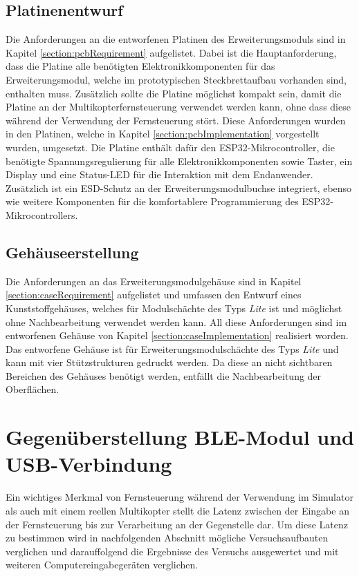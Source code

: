 \subsection{Platinenentwurf}
Die Anforderungen an die entworfenen Platinen des Erweiterungsmoduls sind in Kapitel \ref{section:pcbRequirement} aufgelistet. Dabei ist die Hauptanforderung, dass die Platine alle benötigten Elektronikkomponenten für das Erweiterungsmodul, welche im prototypischen Steckbrettaufbau vorhanden sind, enthalten muss. Zusätzlich sollte die Platine möglichst kompakt sein, damit die Platine an der Multikopterfernsteuerung verwendet werden kann, ohne dass diese während der Verwendung der Fernsteuerung stört. Diese Anforderungen wurden in den Platinen, welche in Kapitel \ref{section:pcbImplementation} vorgestellt wurden, umgesetzt. Die Platine enthält dafür den ESP32-Mikrocontroller, die benötigte Spannungsregulierung für alle Elektronikkomponenten sowie Taster, ein Display und eine Status-\ac{LED} für die Interaktion mit dem Endanwender. Zusätzlich ist ein \ac{ESD}-Schutz an der Erweiterungsmodulbuchse integriert, ebenso wie weitere Komponenten für die komfortablere Programmierung des ESP32-Mikrocontrollers.

\subsection{Gehäuseerstellung}
Die Anforderungen an das Erweiterungsmodulgehäuse sind in Kapitel \ref{section:caseRequirement} aufgelistet und umfassen den Entwurf eines Kunststoffgehäuses, welches für Modulschächte des Typs \textit{Lite} ist und möglichst ohne Nachbearbeitung verwendet werden kann. All diese Anforderungen sind im entworfenen Gehäuse von Kapitel \ref{section:caseImplementation} realisiert worden. Das entworfene Gehäuse ist für Erweiterungsmodulschächte des Typs \textit{Lite} und kann mit vier Stützstrukturen gedruckt werden. Da diese an nicht sichtbaren Bereichen des Gehäuses benötigt werden, entfällt die Nachbearbeitung der Oberflächen.

\section{Gegenüberstellung \acs{BLE}-Modul und USB-Verbindung}
Ein wichtiges Merkmal von Fernsteuerung während der Verwendung im Simulator als auch mit einem reellen Multikopter stellt die Latenz zwischen der Eingabe an der Fernsteuerung bis zur Verarbeitung an der Gegenstelle dar. Um diese Latenz zu bestimmen wird in nachfolgenden Abschnitt mögliche Versuchsaufbauten verglichen und darauffolgend die Ergebnisse des Versuchs ausgewertet und mit weiteren Computereingabegeräten verglichen.

